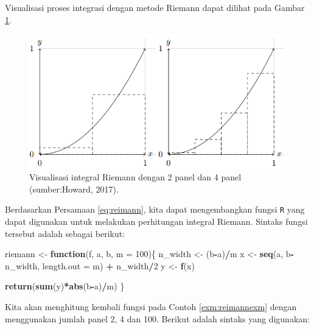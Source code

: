 \documentclass[
]{book}
\newenvironment{Shaded}{\begin{snugshade}}{\end{snugshade}}
\newcommand{\AttributeTok}[1]{\textcolor[rgb]{0.13,0.29,0.53}{#1}}
\newcommand{\ControlFlowTok}[1]{\textcolor[rgb]{0.13,0.29,0.53}{\textbf{#1}}}
\newcommand{\DecValTok}[1]{\textcolor[rgb]{0.00,0.00,0.81}{#1}}
\newcommand{\FunctionTok}[1]{\textcolor[rgb]{0.13,0.29,0.53}{\textbf{#1}}}
\newcommand{\NormalTok}[1]{#1}
\newcommand{\OtherTok}[1]{\textcolor[rgb]{0.56,0.35,0.01}{#1}}
\newcommand{\SpecialCharTok}[1]{\textcolor[rgb]{0.81,0.36,0.00}{\textbf{#1}}}
\theoremstyle{definition}
\theoremstyle{definition}
\theoremstyle{definition}
\theoremstyle{definition}
\theoremstyle{remark}
\begin{document}
Visualisasi proses integrasi dengan metode Riemann dapat dilihat pada Gambar \ref{fig:midpt}.

\begin{figure}

{\centering \includegraphics[width=0.9\linewidth]{./images/midpt} 

}

\caption{Visualisasi integral Riemann dengan 2 panel dan 4 panel (sumber:Howard, 2017).}\label{fig:midpt}
\end{figure}

Berdasarkan Persamaan \eqref{eq:reimann}, kita dapat mengembangkan fungsi \texttt{R} yang dapat digunakan untuk melakukan perhitungan integral Riemann. Sintaks fungsi tersebut adalah sebagai berikut:

\begin{Shaded}
\begin{Highlighting}[]
\NormalTok{riemann }\OtherTok{\textless{}{-}} \ControlFlowTok{function}\NormalTok{(f, a, b, }\AttributeTok{m =} \DecValTok{100}\NormalTok{)\{}
\NormalTok{  n\_width }\OtherTok{\textless{}{-}}\NormalTok{ (b}\SpecialCharTok{{-}}\NormalTok{a)}\SpecialCharTok{/}\NormalTok{m}
\NormalTok{  x }\OtherTok{\textless{}{-}} \FunctionTok{seq}\NormalTok{(a, b}\SpecialCharTok{{-}}\NormalTok{n\_width, }\AttributeTok{length.out =}\NormalTok{ m) }\SpecialCharTok{+}\NormalTok{ n\_width}\SpecialCharTok{/}\DecValTok{2}
\NormalTok{  y }\OtherTok{\textless{}{-}} \FunctionTok{f}\NormalTok{(x)}
  
  \FunctionTok{return}\NormalTok{(}\FunctionTok{sum}\NormalTok{(y)}\SpecialCharTok{*}\FunctionTok{abs}\NormalTok{(b}\SpecialCharTok{{-}}\NormalTok{a)}\SpecialCharTok{/}\NormalTok{m)}
\NormalTok{\}}
\end{Highlighting}
\end{Shaded}

Kita akan menghitung kembali fungsi pada Contoh \ref{exm:reimannexm} dengan menggunakan jumlah panel 2, 4 dan 100. Berikut adalah sintaks yang digunakan:
\end{document}

